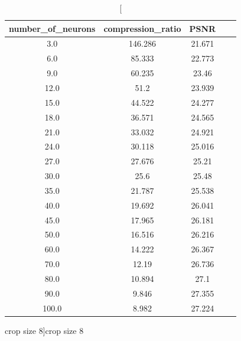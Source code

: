 \documentclass[../IDP_Task5_Karwowski_Kowalewski.tex]{subfiles}
\begin{document}
{{        \begin{table}[!htbp]
            \centering
            \begin{tabular}{|c|c|c|c|c|}
                \hline
                number\_of\_neurons & compression\_ratio & PSNR \\ \hline
                3.0 & 146.286 & 21.671 \\ \hline
                6.0 & 85.333 & 22.773 \\ \hline
                9.0 & 60.235 & 23.46 \\ \hline
                12.0 & 51.2 & 23.939 \\ \hline
                15.0 & 44.522 & 24.277 \\ \hline
                18.0 & 36.571 & 24.565 \\ \hline
                21.0 & 33.032 & 24.921 \\ \hline
                24.0 & 30.118 & 25.016 \\ \hline
                27.0 & 27.676 & 25.21 \\ \hline
                30.0 & 25.6 & 25.48 \\ \hline
                35.0 & 21.787 & 25.538 \\ \hline
                40.0 & 19.692 & 26.041 \\ \hline
                45.0 & 17.965 & 26.181 \\ \hline
                50.0 & 16.516 & 26.216 \\ \hline
                60.0 & 14.222 & 26.367 \\ \hline
                70.0 & 12.19 & 26.736 \\ \hline
                80.0 & 10.894 & 27.1 \\ \hline
                90.0 & 9.846 & 27.355 \\ \hline
                100.0 & 8.982 & 27.224 \\ \hline
            \end{tabular}
            \caption
            [crop size 8]{crop size 8}
            \label{crop_size_8}
        \end{table}

}}
\end{document}
